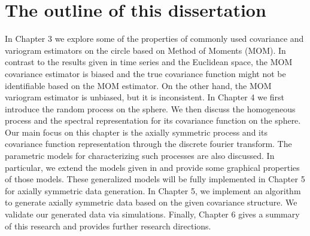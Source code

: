 \section{The outline of this dissertation}

In Chapter 3 we explore some of the properties of commonly used covariance and variogram estimators on the circle based on Method of Moments (MOM). In contrast to the results given in time series and the Euclidean space, the MOM covariance estimator is biased and the true covariance function might not be identifiable based on the MOM estimator. On the other hand, the MOM variogram estimator is unbiased, but it is inconsistent. In Chapter 4 we first introduce the random process on the sphere. We then discuss the homogeneous process and the spectral representation for its covariance function on the sphere. Our main focus on this chapter is the axially symmetric process and its covariance function representation through the discrete fourier transform. The parametric models for characterizing such processes are also discussed. In particular, we extend the models given in \cite{Huang2012} and provide some graphical properties of those models. These generalized models will be fully implemented in Chapter 5 for axially symmetric data generation. In Chapter 5, we implement an algorithm to generate axially symmetric data based on the given covariance structure. We validate our generated data via simulations. Finally, Chapter 6 gives a summary of this research and provides further research directions.



